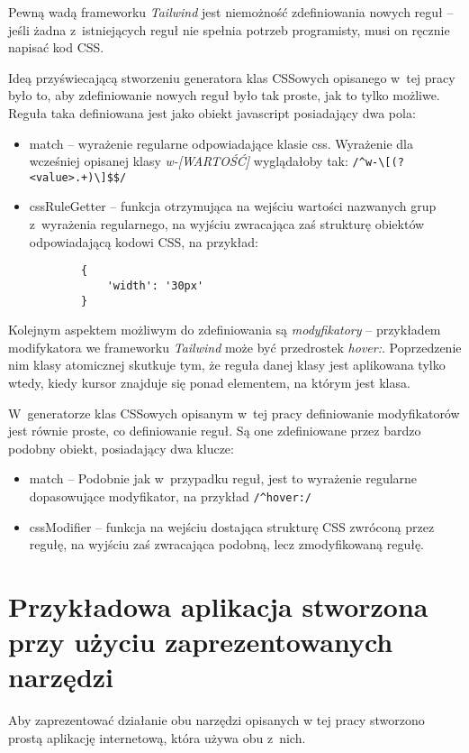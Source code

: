 \documentclass{SGGW-thesis}
\begin{document}
Pewną wadą frameworku \emph{Tailwind} jest niemożność zdefiniowania nowych reguł -- jeśli żadna z~istniejących reguł nie spełnia potrzeb programisty, musi on ręcznie napisać kod CSS.

Ideą przyświecającą stworzeniu generatora klas CSSowych opisanego w~tej pracy było to, aby zdefiniowanie nowych reguł było tak proste, jak to tylko możliwe. Reguła taka definiowana jest jako obiekt javascript posiadający dwa pola:
\begin{itemize}
    \item match -- wyrażenie regularne odpowiadające klasie css. Wyrażenie dla wcześniej opisanej klasy \emph{w-[WARTOŚĆ]} wyglądałoby tak: \verb|/^w-\[(?<value>.+)\]$$/|
    \item cssRuleGetter -- funkcja otrzymująca na wejściu wartości nazwanych grup z~wyrażenia regularnego, na wyjściu zwracająca zaś strukturę obiektów odpowiadającą kodowi CSS, na przykład:
    \begin{verbatim}
        {
            'width': '30px'
        }
    \end{verbatim}
\end{itemize}

Kolejnym aspektem możliwym do zdefiniowania są \emph{modyfikatory} -- przykładem modifykatora we frameworku \emph{Tailwind} może być przedrostek \emph{hover:}. Poprzedzenie nim klasy atomicznej skutkuje tym, że reguła danej klasy jest aplikowana tylko wtedy, kiedy kursor znajduje się ponad elementem, na którym jest klasa.

W~generatorze klas CSSowych opisanym w~tej pracy definiowanie modyfikatorów jest równie proste, co definiowanie reguł. Są one zdefiniowane przez bardzo podobny obiekt, posiadający dwa klucze:
\begin{itemize}
    \item match -- Podobnie jak w~przypadku reguł, jest to wyrażenie regularne dopasowujące modyfikator, na przykład \verb|/^hover:/|
    \item cssModifier -- funkcja na wejściu dostająca strukturę CSS zwróconą przez regułę, na wyjściu zaś zwracająca podobną, lecz zmodyfikowaną regułę.
\end{itemize}

\chapter{Przykładowa aplikacja stworzona przy użyciu zaprezentowanych narzędzi}
Aby zaprezentować działanie obu narzędzi opisanych w tej pracy stworzono prostą aplikację internetową, która używa obu z~nich.
\end{document}
